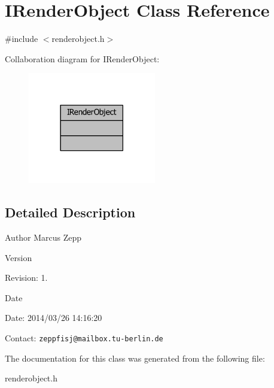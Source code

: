 \section{I\-Render\-Object Class Reference}
\label{classIRenderObject}


{\ttfamily \#include $<$renderobject.\-h$>$}



Collaboration diagram for I\-Render\-Object\-:
\nopagebreak
\begin{figure}[H]
\begin{center}
\leavevmode
\includegraphics[width=158pt]{d6/dea/classIRenderObject__coll__graph}
\end{center}
\end{figure}


\subsection{Detailed Description}
\begin{DoxyAuthor}{Author}
Marcus Zepp
\end{DoxyAuthor}
\begin{DoxyVersion}{Version}

\end{DoxyVersion}
\begin{DoxyParagraph}{Revision\-:}
1. 
\end{DoxyParagraph}


\begin{DoxyDate}{Date}

\end{DoxyDate}
\begin{DoxyParagraph}{Date\-:}
2014/03/26 14\-:16\-:20 
\end{DoxyParagraph}


Contact\-: {\tt zeppfisj@mailbox.\-tu-\/berlin.\-de} 

The documentation for this class was generated from the following file\-:\begin{DoxyCompactItemize}
\item 
renderobject.\-h\end{DoxyCompactItemize}
